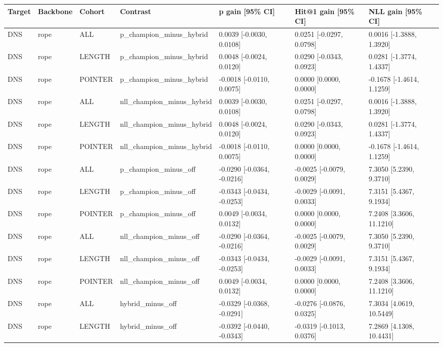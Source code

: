 \begin{tabular}{lllllll}
\hline
Target & Backbone & Cohort & Contrast & p gain [95\% CI] & Hit@1 gain [95\% CI] & NLL gain [95\% CI] \\
\hline
DNS & rope & ALL & p\_champion\_minus\_hybrid & 0.0039 [-0.0030, 0.0108] & 0.0251 [-0.0297, 0.0798] & 0.0016 [-1.3888, 1.3920] \\
DNS & rope & LENGTH & p\_champion\_minus\_hybrid & 0.0048 [-0.0024, 0.0120] & 0.0290 [-0.0343, 0.0923] & 0.0281 [-1.3774, 1.4337] \\
DNS & rope & POINTER & p\_champion\_minus\_hybrid & -0.0018 [-0.0110, 0.0075] & 0.0000 [0.0000, 0.0000] & -0.1678 [-1.4614, 1.1259] \\
DNS & rope & ALL & nll\_champion\_minus\_hybrid & 0.0039 [-0.0030, 0.0108] & 0.0251 [-0.0297, 0.0798] & 0.0016 [-1.3888, 1.3920] \\
DNS & rope & LENGTH & nll\_champion\_minus\_hybrid & 0.0048 [-0.0024, 0.0120] & 0.0290 [-0.0343, 0.0923] & 0.0281 [-1.3774, 1.4337] \\
DNS & rope & POINTER & nll\_champion\_minus\_hybrid & -0.0018 [-0.0110, 0.0075] & 0.0000 [0.0000, 0.0000] & -0.1678 [-1.4614, 1.1259] \\
DNS & rope & ALL & p\_champion\_minus\_off & -0.0290 [-0.0364, -0.0216] & -0.0025 [-0.0079, 0.0029] & 7.3050 [5.2390, 9.3710] \\
DNS & rope & LENGTH & p\_champion\_minus\_off & -0.0343 [-0.0434, -0.0253] & -0.0029 [-0.0091, 0.0033] & 7.3151 [5.4367, 9.1934] \\
DNS & rope & POINTER & p\_champion\_minus\_off & 0.0049 [-0.0034, 0.0132] & 0.0000 [0.0000, 0.0000] & 7.2408 [3.3606, 11.1210] \\
DNS & rope & ALL & nll\_champion\_minus\_off & -0.0290 [-0.0364, -0.0216] & -0.0025 [-0.0079, 0.0029] & 7.3050 [5.2390, 9.3710] \\
DNS & rope & LENGTH & nll\_champion\_minus\_off & -0.0343 [-0.0434, -0.0253] & -0.0029 [-0.0091, 0.0033] & 7.3151 [5.4367, 9.1934] \\
DNS & rope & POINTER & nll\_champion\_minus\_off & 0.0049 [-0.0034, 0.0132] & 0.0000 [0.0000, 0.0000] & 7.2408 [3.3606, 11.1210] \\
DNS & rope & ALL & hybrid\_minus\_off & -0.0329 [-0.0368, -0.0291] & -0.0276 [-0.0876, 0.0325] & 7.3034 [4.0619, 10.5449] \\
DNS & rope & LENGTH & hybrid\_minus\_off & -0.0392 [-0.0440, -0.0343] & -0.0319 [-0.1013, 0.0376] & 7.2869 [4.1308, 10.4431] \\

\end{tabular}
